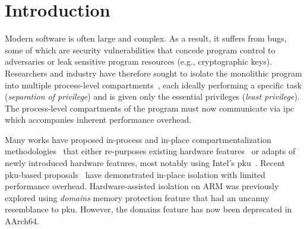 \section{Introduction}\label{sec:capacity:intro}
Modern software is often large and complex.
As a result, it suffers from bugs, some of which are security vulnerabilities that concede program control to adversaries or leak sensitive program resources (e.g., cryptographic keys).
Researchers and industry have therefore sought to isolate the monolithic program into multiple process-level compartments~\cite{aces,privman,privtrans,wedge,hakc,muscope}, each ideally performing a specific task (\emph{separation of privilege}) and is given only the essential privileges (\emph{least privilege}).
The process-level compartments of the program must now communicate via \gls{ipc} which accompanies inherent performance overhead.


Many works have proposed in-process and in-place compartmentalization methodologies~\cite{lotrx86,chen2016shreds,seimi,erim,hodor,jenny,cerberus,donky} that either re-purposes existing hardware features~\cite{lotrx86,chen2016shreds,seimi} or adapts of newly introduced hardware features, most notably using Intel's \gls{pku}~\cite{intel-manual}.
Recent \gls{pku}-based proposals~\cite{pkrusafe,hodor,erim,jenny,cerberus} have demonstrated in-place isolation with limited performance overhead.
Hardware-assisted isolation on ARM was previously explored \cite{chen2016shreds} using \emph{domains} memory protection feature that had an uncanny resemblance to \gls{pku}.
However, the domains feature has now been deprecated in AArch64.

